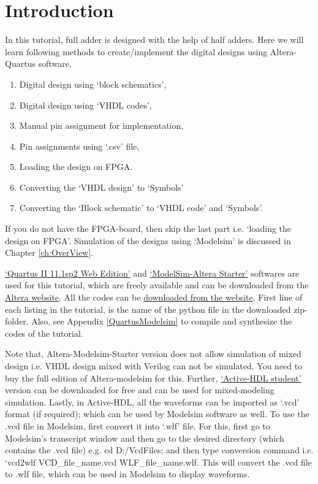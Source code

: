 \section{Introduction}
In this tutorial, full adder is designed with the help of half adders. Here we will learn following methods to create/implement the digital designs using Altera-Quartus software, 

\begin{enumerate}
	\item Digital design using `block schematics',
	\item Digital design using `VHDL codes',
	\item Manual pin assignment for implementation,
	\item Pin assignments using `.csv' file,
	\item Loading the design on FPGA. 
	\item Converting the `VHDL design' to `Symbols'
	\item Converting the `Block schematic' to `VHDL code' and `Symbols'. 
\end{enumerate}

If you do not have the FPGA-board, then skip the last part i.e. `loading the design on FPGA'. Simulation of the designs using `Modelsim' is discussed in Chapter \ref{ch:OverView}. 

\href{https://www.altera.com/downloads/software/quartus-ii-we/111sp2.html}{`Quartus II 11.1sp2 Web Edition'} and \href{https://www.altera.com/downloads/software/modelsim-starter/111.html}{`ModelSim-Altera Starter'} softwares are used for this tutorial, which are freely available and can be downloaded from the \href{https://www.altera.com/downloads/download-center.html}{Altera website}. All the codes can be \href{http://pythondsp.readthedocs.io/en/latest/pythondsp/toc.html}{downloaded from the website}. First line of each listing in the tutorial, is the name of the python file in the downloaded zip-folder. Also, see Appendix \ref{QuartusModelsim} to compile and synthesize the codes of the tutorial.

Note that, Altera-Modelsim-Starter version does not allow simulation of mixed design i.e. VHDL design mixed with Verilog can not be simulated. You need to buy the full edition of Altera-modelsim for this. Further, \href{https://www.aldec.com/en/products/fpga_simulation/active_hdl_student}{`Active-HDL student'} version can be downloaded for free and can be used for mixed-modeling simulation. Lastly, in Active-HDL, all the waveforms can be imported as `.vcd' format (if required); which can be used by Modelsim software as well. To use the .vcd file in Modelsim, first convert it into `.wlf' file. For this, first go to Modelsim's transcript window and then go to the desired directory (which contains the .vcd file) e.g. cd D:/VcdFiles; and then type conversion command i.e. `vcd2wlf VCD\_file\_name.vcd WLF\_file\_name.wlf. This will convert the .vcd file to .wlf file, which can be used in Modelsim to display waveforms.

